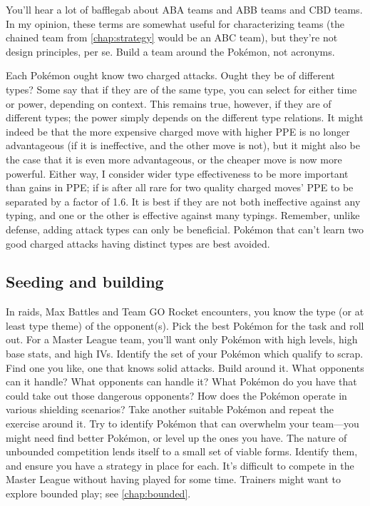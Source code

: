 \begin{tipbox}[title=Dubwool+Wooloo+Mareep is a BAA team]
You'll hear a lot of bafflegab about ABA teams and ABB teams and CBD teams.
  In my opinion, these terms are somewhat useful for characterizing teams
  (the chained team from \autoref{chap:strategy} would be an ABC team),
  but they're not design principles, per se.
Build a team around the Pokémon, not acronyms.
\end{tipbox}

Each Pokémon ought know two charged attacks.
Ought they be of different types?
Some say that if they are of the same type, you can select for either time or power, depending on context.
This remains true, however, if they are of different types; the power simply depends on
  the different type relations.
It might indeed be that the more expensive charged move with higher PPE is no
  longer advantageous (if it is ineffective, and the other move is not),
  but it might also be the case that it is even more advantageous,
  or the cheaper move is now more powerful.
Either way, I consider wider type effectiveness to be more important than gains in PPE;
  if is after all rare for two quality charged moves' PPE to be separated by a factor of 1.6.
It is best if they are not both ineffective against any typing, and one or the
  other is effective against many typings.
Remember, unlike defense, adding attack types can only be beneficial.
Pokémon that can't learn two good charged attacks having distinct types are best avoided.

\subsection{Seeding and building\label{subsec:seeding}}
In raids, Max Battles and Team GO Rocket encounters, you know the type (or at least type theme)
 of the opponent(s).
Pick the best Pokémon for the task and roll out.
For a Master League team, you'll want only Pokémon with high levels, high base stats, and high IVs.
Identify the set of your Pokémon which qualify to scrap.
Find one you like, one that knows solid attacks.
Build around it.
What opponents can it handle?
What opponents can handle it?
What Pokémon do you have that could take out those dangerous opponents?
How does the Pokémon operate in various shielding scenarios?
Take another suitable Pokémon and repeat the exercise around it.
Try to identify Pokémon that can overwhelm your team---you might need find better
 Pokémon, or level up the ones you have.
The nature of unbounded competition lends itself to a small set of viable forms.
Identify them, and ensure you have a strategy in place for each.
It's difficult to compete in the Master League without having played for some time.
Trainers might want to explore bounded play; see \autoref{chap:bounded}.


